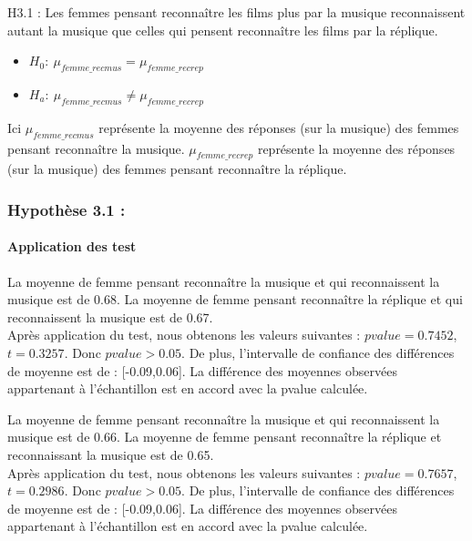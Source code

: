 \documentclass{article} %
\begin{document}
H3.1 : Les femmes pensant reconnaître les films plus par la musique reconnaissent autant la musique que celles qui pensent reconnaître les films par la réplique.
\begin{itemize}
	\item $H_0: \ \mu_{femme\_recmus} = \mu_{femme\_recrep}$
	\item $H_a: \ \mu_{femme\_recmus} \ne \mu_{femme\_recrep}$
\end{itemize}

Ici $\mu_{femme\_recmus}$ représente la moyenne des réponses (sur la musique) des femmes pensant reconnaître la musique.  $\mu_{femme\_recrep}$ représente la moyenne des réponses (sur la musique) des femmes pensant reconnaître la réplique.
\subsubsection{Hypothèse 3.1 :}
\paragraph{ Application des test\\}
La moyenne de femme pensant reconnaître la musique et qui reconnaissent la musique est de 0.68. La moyenne de femme pensant reconnaître la réplique et qui reconnaissent la musique est de 0.67.\\
Après application du test, nous obtenons les valeurs suivantes : $pvalue =  0.7452$, $t = 0.3257$. Donc ${pvalue>0.05}$. De plus, l'intervalle de confiance des différences de moyenne est de : [-0.09,0.06]. La différence des moyennes observées appartenant à l'échantillon est en accord avec la pvalue calculée.

La moyenne de femme pensant reconnaître la musique et qui reconnaissent la musique est de 0.66. La moyenne de femme pensant reconnaître la réplique et reconnaissant la musique est de 0.65.\\
Après application du test, nous obtenons les valeurs suivantes : $pvalue =   0.7657$, $t =  0.2986$. Donc ${pvalue>0.05}$. De plus, l'intervalle de confiance des différences de moyenne est de : [-0.09,0.06]. La différence des moyennes observées appartenant à l'échantillon est en accord avec la pvalue calculée.
\newpage
\end{document}
